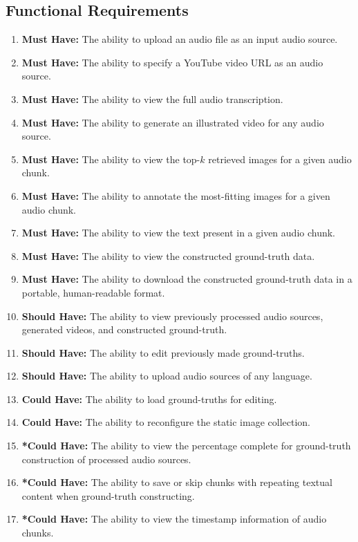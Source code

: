 \documentclass{l4proj}
\begin{document}
\subsection{Functional Requirements}
\begin{enumerate}
    \item \label{req:1} \textbf{Must Have:} The ability to upload an audio file as an input audio source.
    \item \label{req:2} \textbf{Must Have:} The ability to specify a YouTube video URL as an audio source.
    \item \label{req:3} \textbf{Must Have:} The ability to view the full audio transcription.
    \item \label{req:4} \textbf{Must Have:} The ability to generate an illustrated video for any audio source.
    \item \label{req:5} \textbf{Must Have:} The ability to view the top-$k$ retrieved images for a given audio chunk.
    \item \label{req:6} \textbf{Must Have:} The ability to annotate the most-fitting images for a given audio chunk.
    \item \label{req:7} \textbf{Must Have:} The ability to view the text present in a given audio chunk.
    \item \label{req:8} \textbf{Must Have:} The ability to view the constructed ground-truth data.
    \item \label{req:9} \textbf{Must Have:} The ability to download the constructed ground-truth data in a portable, human-readable format.
    \item \label{req:10} \textbf{Should Have:} The ability to view previously processed audio sources, generated videos, and constructed ground-truth.
    \item \label{req:11} \textbf{Should Have:} The ability to edit previously made ground-truths.
    \item \label{req:12} \textbf{Should Have:} The ability to upload audio sources of any language.
    \item \label{req:13} \textbf{Could Have:} The ability to load ground-truths for editing.
    \item \label{req:14} \textbf{Could Have:} The ability to reconfigure the static image collection.
    \item \label{req:15} \textbf{*Could Have:} The ability to view the percentage complete for ground-truth construction of processed audio sources.
    \item \label{req:16} \textbf{*Could Have:} The ability to save or skip chunks with repeating textual content when ground-truth constructing.
    \item \label{req:17} \textbf{*Could Have:} The ability to view the timestamp information of audio chunks.
\end{enumerate}
\end{document}
